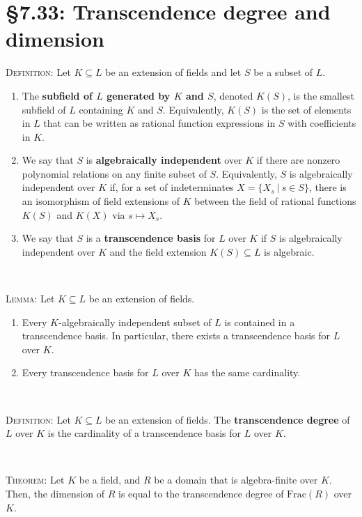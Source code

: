 \documentclass[12pt]{amsart}
\renewcommand{\1}{\mathbbm{1}}
\newcommand{\showsol}[1]{\def\displaysol{#1}}
\begin{document}
\showsol{0}
	
	\thispagestyle{empty}
	
	\section*{\S7.33: Transcendence degree and dimension}
	
	\begin{framed}
	
	\noindent	\textsc{Definition:} Let $K\subseteq L$ be an extension of fields and let $S$ be a subset of $L$.
	\begin{enumerate}
	\item The \textbf{subfield of $L$ generated by $K$ and $S$}, denoted $K(S)$, is the smallest subfield of $L$ containing $K$ and $S$. Equivalently, $K(S)$ is the set of elements in $L$ that can be written as rational function expressions in $S$ with coefficients in $K$.
	\item We say that $S$ is \textbf{algebraically independent} over $K$ if there are nonzero polynomial relations on any finite subset of $S$.
	Equivalently, $S$ is algebraically independent over $K$ if, for a set of indeterminates $X=\{X_s \ | \ s\in S\}$, there is an isomorphism of field extensions of $K$ between the field of rational functions $K(S)$ and $K(X)$ via $s\mapsto X_s$.
	\item We say that $S$ is a \textbf{transcendence basis} for $L$ over $K$ if $S$ is algebraically independent over $K$ and the field extension $K(S) \subseteq L$ is algebraic.
	\end{enumerate}
	
	\
	
	\noindent \textsc{Lemma:} Let $K\subseteq L$ be an extension of fields.
\begin{enumerate}
\item Every $K$-algebraically independent subset of $L$ is contained in a transcendence basis. In particular, there exists a transcendence basis for $L$ over $K$.
\item Every transcendence basis for $L$ over $K$ has the same cardinality.
\end{enumerate}
	
	\
	
\noindent	\textsc{Definition:} Let $K\subseteq L$ be an extension of fields. The \textbf{transcendence degree} of $L$ over $K$ is the cardinality of a transcendence basis for $L$ over $K$.
	

	\
	
\noindent	\textsc{Theorem:} Let $K$ be a field, and $R$ be a domain that is algebra-finite over $K$. Then, the dimension of $R$ is equal to the transcendence degree of $\mathrm{Frac}(R)$ over $K$.
\end{framed}
\end{document}
